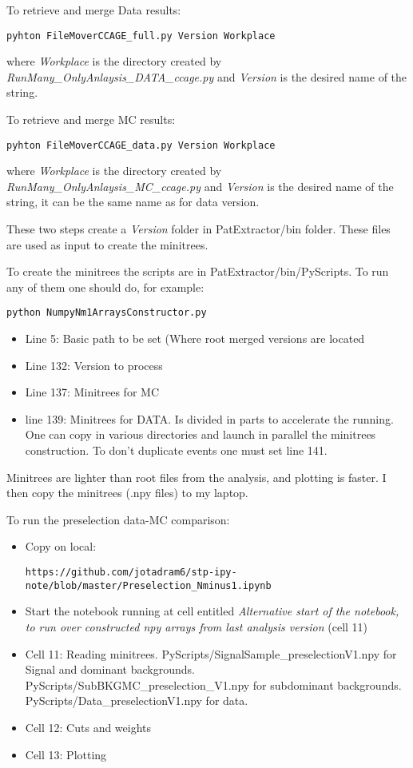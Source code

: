 \documentclass[11pt,a4paper]{article}
\begin{document}
To retrieve and merge Data results:
\begin{verbatim}
pyhton FileMoverCCAGE_full.py Version Workplace
\end{verbatim}where \textit{Workplace} is the directory created by \textit{RunMany\_OnlyAnlaysis\_DATA\_ccage.py} and \textit{Version} is the desired name of the string.

To retrieve and merge MC results:
\begin{verbatim}
pyhton FileMoverCCAGE_data.py Version Workplace
\end{verbatim}where \textit{Workplace} is the directory created by \textit{RunMany\_OnlyAnlaysis\_MC\_ccage.py} and \textit{Version} is the desired name of the string, it can be the same name as for data version. 

These two steps create a \textit{Version} folder in PatExtractor/bin folder. These files are used as input to create the minitrees. 

To create the minitrees the scripts are in PatExtractor/bin/PyScripts. To run any of them one should do, for example:
\begin{verbatim}
python NumpyNm1ArraysConstructor.py
\end{verbatim}

\begin{itemize}
\item Line 5: Basic path to be set (Where root merged versions are located
\item Line 132: Version to process
\item Line 137: Minitrees for MC
\item line 139: Minitrees for DATA. Is divided in parts to accelerate the running. One can copy in various directories and launch in parallel the minitrees construction. To don't duplicate events one must set line 141.
\end{itemize}

Minitrees are lighter than root files from the analysis, and plotting is faster. I then copy the minitrees (.npy files) to my laptop.

To run the preselection data-MC comparison:
\begin{itemize}
\item Copy on local:
\begin{verbatim}
https://github.com/jotadram6/stp-ipy-note/blob/master/Preselection_Nminus1.ipynb
\end{verbatim}
\item Start the notebook running at cell entitled \textit{Alternative start of the notebook, to run over constructed npy arrays from last analysis version} (cell 11)
\item Cell 11: Reading minitrees. PyScripts/SignalSample\_preselectionV1.npy for Signal and dominant backgrounds. PyScripts/SubBKGMC\_preselection\_V1.npy for subdominant backgrounds. PyScripts/Data\_preselectionV1.npy for data. 
\item Cell 12: Cuts and weights
\item Cell 13: Plotting
\end{itemize}
\end{document}
